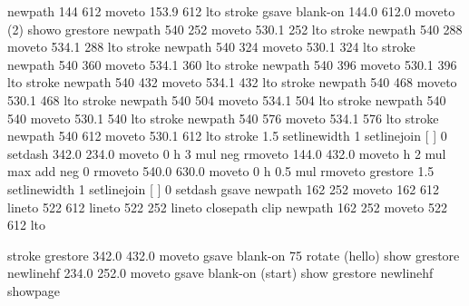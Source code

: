 newpath 144 612 moveto 153.9 612 lto stroke
gsave blank-on    144.0   612.0 moveto (2) showo  grestore
newpath 540 252 moveto 530.1 252 lto stroke
newpath 540 288 moveto 534.1 288 lto stroke
newpath 540 324 moveto 530.1 324 lto stroke
newpath 540 360 moveto 534.1 360 lto stroke
newpath 540 396 moveto 530.1 396 lto stroke
newpath 540 432 moveto 534.1 432 lto stroke
newpath 540 468 moveto 530.1 468 lto stroke
newpath 540 504 moveto 534.1 504 lto stroke
newpath 540 540 moveto 530.1 540 lto stroke
newpath 540 576 moveto 534.1 576 lto stroke
newpath 540 612 moveto 530.1 612 lto stroke
  1.5 setlinewidth 1 setlinejoin [ ] 0 setdash
   342.0   234.0 moveto 0 h 3 mul neg rmoveto
   144.0   432.0 moveto h 2 mul max add neg 0 rmoveto
   540.0   630.0 moveto 0 h 0.5 mul rmoveto
grestore
  1.5 setlinewidth 1 setlinejoin [ ] 0 setdash
gsave newpath 162 252 moveto 162 612 lineto
              522 612 lineto 522 252 lineto closepath clip
newpath 162 252 moveto 522 612 lto

 stroke grestore
   342.0   432.0 moveto
gsave blank-on 75 rotate (hello) show   grestore newlinehf
   234.0   252.0 moveto
gsave blank-on (start) show   grestore newlinehf
showpage

